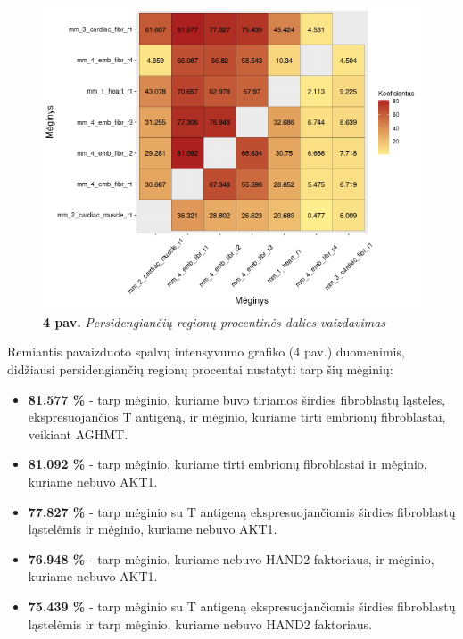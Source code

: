 \documentclass[12pt]{article}
\begin{document}
\begin{figure}[htb]
    \begin{center}
        \includegraphics[width=0.7\linewidth]{../Figures/peak_overlaps_between_samples.png}
        \caption*{\textbf{4 pav.} \emph{Persidengiančių regionų procentinės
                  dalies vaizdavimas}}
    \end{center}
\end{figure}

Remiantis pavaizduoto spalvų intensyvumo grafiko (4 pav.)
duomenimis, didžiausi persidengiančių regionų procentai
nustatyti tarp šių mėginių:

\begin{itemize}
    \item \textbf{81.577 \%} - tarp mėginio, kuriame buvo tiriamos širdies
            fibroblastų ląstelės, ekspresuojančios T antigeną, ir mėginio,
            kuriame tirti embrionų fibroblastai, veikiant AGHMT.
    \item \textbf{81.092 \%} - tarp mėginio, kuriame tirti embrionų
            fibroblastai ir mėginio, kuriame nebuvo AKT1.
    \item \textbf{77.827 \%} - tarp mėginio su T antigeną ekspresuojančiomis
            širdies fibroblastų ląstelėmis ir mėginio, kuriame nebuvo AKT1.
    \item \textbf{76.948 \%} - tarp mėginio, kuriame nebuvo HAND2
            faktoriaus, ir mėginio, kuriame nebuvo AKT1.
    \item \textbf{75.439 \%} - tarp mėginio su T antigeną ekspresuojančiomis
            širdies fibroblastų ląstelėmis ir tarp mėginio, kuriame nebuvo HAND2
            faktoriaus.
  \end{itemize}

\end{document}
